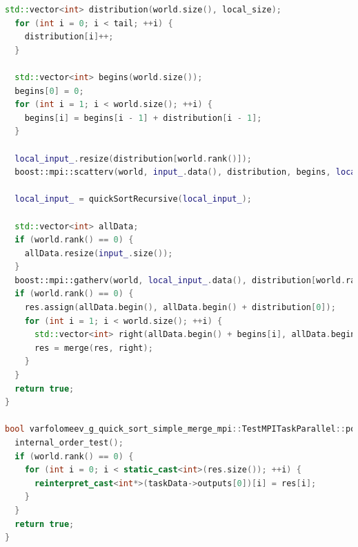 \documentclass[a4paper,12pt]{article}
\begin{document}
\begin{lstlisting}[language=C++]
  std::vector<int> distribution(world.size(), local_size);
  for (int i = 0; i < tail; ++i) {
    distribution[i]++;
  }

  std::vector<int> begins(world.size());
  begins[0] = 0;
  for (int i = 1; i < world.size(); ++i) {
    begins[i] = begins[i - 1] + distribution[i - 1];
  }

  local_input_.resize(distribution[world.rank()]);
  boost::mpi::scatterv(world, input_.data(), distribution, begins, local_input_.data(), distribution[world.rank()], 0);

  local_input_ = quickSortRecursive(local_input_);

  std::vector<int> allData;
  if (world.rank() == 0) {
    allData.resize(input_.size());
  }
  boost::mpi::gatherv(world, local_input_.data(), distribution[world.rank()], allData.data(), distribution, begins, 0);
  if (world.rank() == 0) {
    res.assign(allData.begin(), allData.begin() + distribution[0]);
    for (int i = 1; i < world.size(); ++i) {
      std::vector<int> right(allData.begin() + begins[i], allData.begin() + begins[i] + distribution[i]);
      res = merge(res, right);
    }
  }
  return true;
}

bool varfolomeev_g_quick_sort_simple_merge_mpi::TestMPITaskParallel::post_processing() {
  internal_order_test();
  if (world.rank() == 0) {
    for (int i = 0; i < static_cast<int>(res.size()); ++i) {
      reinterpret_cast<int*>(taskData->outputs[0])[i] = res[i];
    }
  }
  return true;
}

\end{lstlisting}
\end{document}
